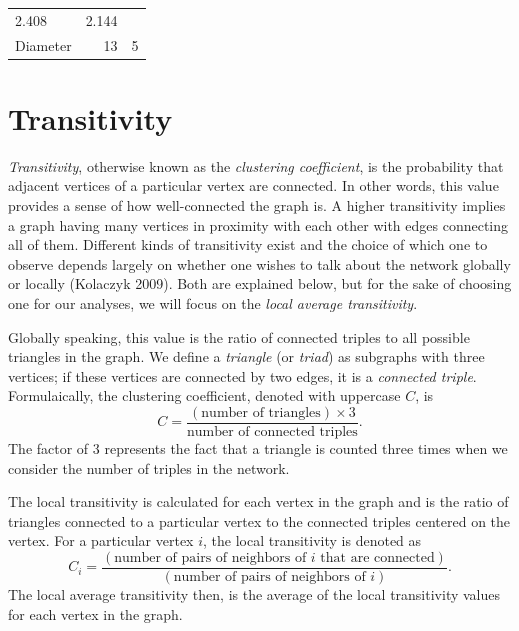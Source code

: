 \documentclass[12pt,twoside]{amherstthesis}
\begin{document}
\begin{longtable}[]{@{}lrr@{}}
\begin{minipage}[t]{0.29\columnwidth}
  2.408\strut
  \end{minipage} & \begin{minipage}[t]{0.23\columnwidth}\raggedleft\strut
  2.144\strut
  \end{minipage}\tabularnewline
  \begin{minipage}[t]{0.29\columnwidth}\raggedright\strut
  Diameter\strut
  \end{minipage} & \begin{minipage}[t]{0.29\columnwidth}\raggedleft\strut
  13\strut
  \end{minipage} & \begin{minipage}[t]{0.23\columnwidth}\raggedleft\strut
  5\strut
  \end{minipage}\tabularnewline
  \bottomrule
  \end{longtable}
  
  \section{Transitivity}\label{transitivity}
  
  \emph{Transitivity}, otherwise known as the \emph{clustering
  coefficient}, is the probability that adjacent vertices of a particular
  vertex are connected. In other words, this value provides a sense of how
  well-connected the graph is. A higher transitivity implies a graph
  having many vertices in proximity with each other with edges connecting
  all of them. Different kinds of transitivity exist and the choice of
  which one to observe depends largely on whether one wishes to talk about
  the network globally or locally (Kolaczyk 2009). Both are explained
  below, but for the sake of choosing one for our analyses, we will focus
  on the \emph{local average transitivity}.
  
  Globally speaking, this value is the ratio of connected triples to all
  possible triangles in the graph. We define a \emph{triangle} (or
  \emph{triad}) as subgraphs with three vertices; if these vertices are
  connected by two edges, it is a \emph{connected triple}. Formulaically,
  the clustering coefficient, denoted with uppercase \(C\), is
  \[C = \frac {(\text{number of triangles}) \times 3} {\text{number of connected triples}}.\]
  The factor of \(3\) represents the fact that a triangle is counted three
  times when we consider the number of triples in the network.
  
  The local transitivity is calculated for each vertex in the graph and is
  the ratio of triangles connected to a particular vertex to the connected
  triples centered on the vertex. For a particular vertex \(i\), the local
  transitivity is denoted as
  \[ C_{i} = \frac {(\text{number of pairs of neighbors of } i \text{ that are connected})} {(\text{number of pairs of neighbors of } i)}.\]
  The local average transitivity then, is the average of the local
  transitivity values for each vertex in the graph.
  
\end{document}
